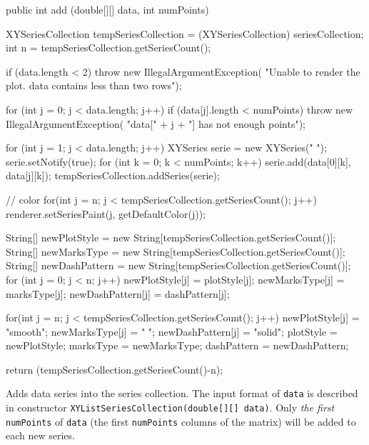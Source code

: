 \begin{code}

   public int add (double[][] data, int numPoints) \begin{hide} {
      XYSeriesCollection tempSeriesCollection =
          (XYSeriesCollection) seriesCollection;
      int n = tempSeriesCollection.getSeriesCount();

      if (data.length < 2)
         throw new IllegalArgumentException(
            "Unable to render the plot. data contains less than two rows");

      for (int j = 0; j < data.length; j++)
         if (data[j].length < numPoints)
            throw new IllegalArgumentException(
               "data[" + j + "] has not enough points");

      for (int j = 1; j < data.length; j++) {
         XYSeries serie = new XYSeries(" ");
         serie.setNotify(true);
         for (int k = 0; k < numPoints; k++)
            serie.add(data[0][k], data[j][k]);
         tempSeriesCollection.addSeries(serie);
      }

      // color
      for(int j = n; j < tempSeriesCollection.getSeriesCount(); j++)
         renderer.setSeriesPaint(j, getDefaultColor(j));

      String[] newPlotStyle = new String[tempSeriesCollection.getSeriesCount()];
      String[] newMarksType = new String[tempSeriesCollection.getSeriesCount()];
      String[] newDashPattern = new String[tempSeriesCollection.getSeriesCount()];
      for (int j = 0; j < n; j++) {
         newPlotStyle[j] = plotStyle[j];
         newMarksType[j] = marksType[j];
         newDashPattern[j] = dashPattern[j];
      }

      for(int j = n; j < tempSeriesCollection.getSeriesCount(); j++) {
         newPlotStyle[j] = "smooth";
         newMarksType[j] = " ";
         newDashPattern[j] = "solid";
      }
      plotStyle = newPlotStyle;
      marksType = newMarksType;
      dashPattern = newDashPattern;

      return (tempSeriesCollection.getSeriesCount()-n);
   }\end{hide}
\end{code}
\begin{tabb}
   Adds  data series into the series collection. The input format of
 \texttt{data} is described in constructor
\texttt{XYListSeriesCollection(double[][] data)}.
  Only \emph{the first} \texttt{numPoints} of \texttt{data}
 (the first \texttt{numPoints} columns of the matrix)
  will be added to each new series.
\end{tabb}
